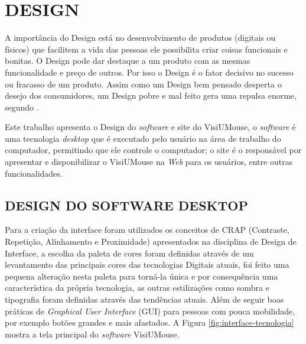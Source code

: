 

\chapter{DESIGN}\label{CAP6}
A importância do Design está no desenvolvimento de produtos (digitais ou físicos) que facilitem a vida das pessoas ele possibilita criar coisas funcionais e bonitas. O Design pode dar destaque a um produto com as mesmas funcionalidade e preço de outros. Por isso o Design é o fator decisivo no sucesso ou fracasso de um produto. Assim como um Design bem pensado desperta o desejo dos consumidores, um Design pobre e mal feito gera uma repulsa enorme, segundo .

Este trabalho apresenta o Design do \textit{software} e site do VisiUMouse, o \textit{software} é uma tecnologia \textit{desktop} que é executado pelo usuário na área de trabalho do computador, permitindo que ele controle o computador; o site é o responsável por apresentar e disponibilizar o VisiUMouse na \textit{Web} para os usuários, entre outras funcionalidades.

\section{DESIGN DO SOFTWARE DESKTOP}\label{Sub:software}
Para a criação da interface foram utilizados os conceitos de CRAP (Contraste, Repetição, Alinhamento e Proximidade) apresentados na disciplina de Design de Interface, a escolha da paleta de cores foram definidas através de um levantamento das principais cores das tecnologias Digitais atuais, foi feito uma pequena alteração nesta paleta para torná-la única e por consequência uma característica da própria tecnologia, as outras estilizações como sombra e tipografia foram definidas através das tendências atuais. Além de seguir boas práticas de \textit{Graphical User Interface} (GUI) para pessoas com pouca mobilidade, por exemplo botões grandes e mais afastados. A Figura \ref{fig:interface-tecnologia} mostra a tela principal do \textit{software} VisiUMouse.

